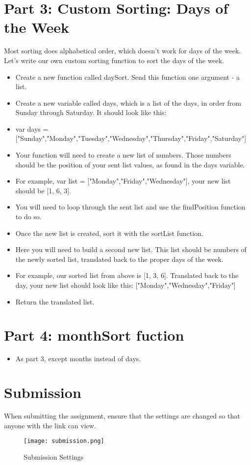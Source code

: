 \documentclass{article}
\begin{document}
\section*{Part 3: Custom Sorting:  Days of the Week}
Most sorting does alphabetical order, which doesn't work for days of the week. Let's write our own custom sorting function to sort the days of the week.
\begin{itemize}
    \item Create a new function called daySort.  Send this function one argument - a list.
    \item Create a new variable called days, which is a list of the days, in order from Sunday through Saturday.  It should look like this:
    \item var days = ["Sunday","Monday","Tuesday","Wednesday","Thursday","Friday","Saturday"]
    \item Your function will need to create a new list of numbers.  Those numbers should be the position of your sent list values, as found in the days variable.
    \item For example, var list = ["Monday","Friday","Wednesday"], your new list should be [1, 6, 3].
    \item You will need to loop through the sent list and use the findPosition function to do so.
    \item Once the new list is created, sort it with the sortList function.
    \item Here you will need to build a second new list.  This list should be numbers of the newly sorted list, translated back to the proper days of the week.
    \item For example, our sorted list from above is [1, 3, 6].  Translated back to the day, your new list should look like this: ["Monday","Wednesday","Friday"]
    \item Return the translated list.
\end{itemize}

\section*{Part 4: monthSort fuction}
\begin{itemize}
    \item As part 3, except months instead of days.
\end{itemize}

\section*{Submission}
When submitting the assignment, ensure that the settings are changed so that anyone with the link can view.
\begin{figure}[H]
  \centering
  \texttt{[image: submission.png]}
  \caption{Submission Settings}
\end{figure}
\end{document}
